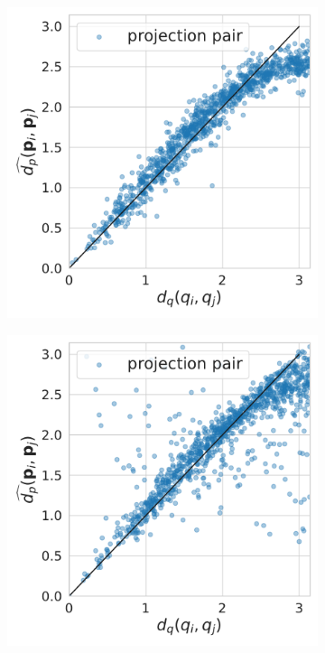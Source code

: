 \begin{figure}
\begin{subfigure}[b]{0.49\linewidth}
        \includegraphics[width=\linewidth]{figures/dPdQ_5j0n.pdf}
        \caption{}
    \end{subfigure}
    \begin{subfigure}[b]{0.49\linewidth}
        \centering
        \includegraphics[width=\linewidth]{figures/dPdQ_5a1a}

\end{subfigure}
\end{figure}
